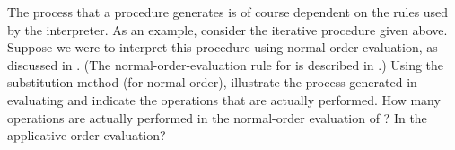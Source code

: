 \begin{exercise}
	\label{Exercise 1.20}
	The process that a procedure generates is of course dependent on the rules used by the interpreter.
	As an example, consider the iterative  procedure given above.
	Suppose we were to interpret this procedure using normal-order evaluation, as discussed in .
	(The normal-order-evaluation rule for  is described in .)
	Using the substitution method (for normal order), illustrate the process generated in evaluating  and indicate the  operations that are actually performed.
	How many  operations are actually performed in the normal-order evaluation of ?
	In the applicative-order evaluation?
\end{exercise}
